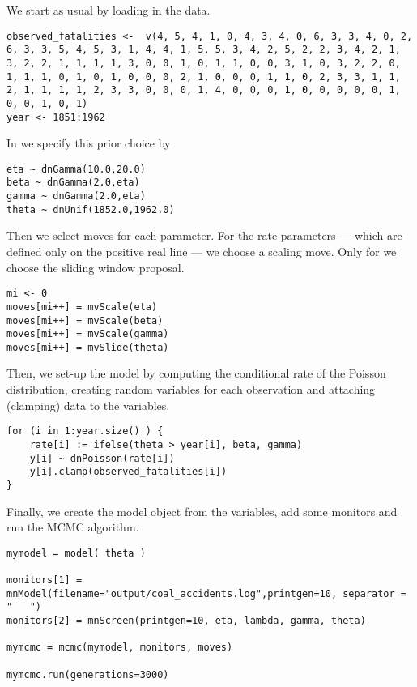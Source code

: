We start as usual by loading in the data.
{\tt \begin{snugshade*}
\begin{lstlisting} 
observed_fatalities <-  v(4, 5, 4, 1, 0, 4, 3, 4, 0, 6, 3, 3, 4, 0, 2, 6, 3, 3, 5, 4, 5, 3, 1, 4, 4, 1, 5, 5, 3, 4, 2, 5, 2, 2, 3, 4, 2, 1, 3, 2, 2, 1, 1, 1, 1, 3, 0, 0, 1, 0, 1, 1, 0, 0, 3, 1, 0, 3, 2, 2, 0, 1, 1, 1, 0, 1, 0, 1, 0, 0, 0, 2, 1, 0, 0, 0, 1, 1, 0, 2, 3, 3, 1, 1, 2, 1, 1, 1, 1, 2, 3, 3, 0, 0, 0, 1, 4, 0, 0, 0, 1, 0, 0, 0, 0, 0, 1, 0, 0, 1, 0, 1)
year <- 1851:1962
\end{lstlisting}
\end{snugshade*}}
In \Rev we specify this prior choice by
{\tt \begin{snugshade*}
\begin{lstlisting} 
eta ~ dnGamma(10.0,20.0)
beta ~ dnGamma(2.0,eta)
gamma ~ dnGamma(2.0,eta)
theta ~ dnUnif(1852.0,1962.0)
\end{lstlisting}
\end{snugshade*}}
Then we select moves for each parameter.
For the rate parameters --- which are defined only on the positive real line --- we choose a scaling move.
Only for  we choose the sliding window proposal.
{\tt \begin{snugshade*}
\begin{lstlisting} 
mi <- 0
moves[mi++] = mvScale(eta)
moves[mi++] = mvScale(beta)
moves[mi++] = mvScale(gamma)
moves[mi++] = mvSlide(theta)
\end{lstlisting}
\end{snugshade*}}
Then, we set-up the model by computing the conditional rate of the Poisson distribution, creating random variables for each observation and attaching (clamping) data to the variables.
{\tt \begin{snugshade*}
\begin{lstlisting} 
for (i in 1:year.size() ) {
    rate[i] := ifelse(theta > year[i], beta, gamma)
    y[i] ~ dnPoisson(rate[i])
    y[i].clamp(observed_fatalities[i])
}
\end{lstlisting}
\end{snugshade*}}
Finally, we create the model object from the variables, add some monitors and run the MCMC algorithm.
{\tt \begin{snugshade*}
\begin{lstlisting} 
mymodel = model( theta )

monitors[1] = mnModel(filename="output/coal_accidents.log",printgen=10, separator = "	")
monitors[2] = mnScreen(printgen=10, eta, lambda, gamma, theta)

mymcmc = mcmc(mymodel, monitors, moves)

mymcmc.run(generations=3000)
\end{lstlisting}
\end{snugshade*}}




